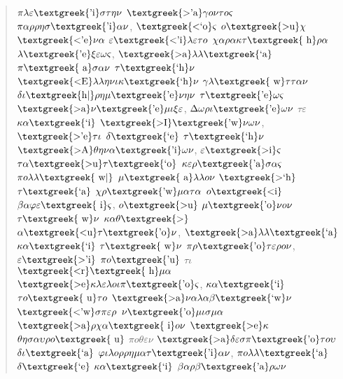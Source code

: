 \begin{quote}
$\pi \lambda \varepsilon \text{\textgreek{'i}}\sigma \tau \eta \nu $ $\text{\textgreek{>'a}}\gamma o\nu \tau o\varsigma $ $\pi \alpha \rho \rho \eta \sigma \text{\textgreek{'i}}\alpha \nu $, $\text{\textgreek{<`o}}\varsigma $ $o\text{\textgreek{>u}}\chi $ $\text{\textgreek{<'e}}\nu \alpha $ $\varepsilon \text{\textgreek{<'i}}\lambda \varepsilon \tau o$ $\chi \alpha \rho \alpha \kappa \tau \text{\textgreek{~h}}\rho \alpha $ $\lambda \text{\textgreek{'e}}\xi \varepsilon \omega \varsigma $, $\text{\textgreek{>a}}\lambda \lambda \text{\textgreek{`a}}$ $\pi \text{\textgreek{~a}}\sigma \alpha \nu $ $\tau \text{\textgreek{`h}}\nu $ $\text{\textgreek{<E}}\lambda \lambda \eta \nu \iota \kappa \text{\textgreek{`h}}\nu $ $\gamma \lambda \text{\textgreek{~w}}\tau \tau \alpha \nu $ $\delta \iota \text{\textgreek{h|}}\rho \eta \mu \text{\textgreek{'e}}\nu \eta \nu $ $\tau \text{\textgreek{'e}}\omega \varsigma $ $\text{\textgreek{>a}}\nu \text{\textgreek{'e}}\mu \iota \xi \varepsilon $, $\Delta \omega \rho \iota \text{\textgreek{'e}}\omega \nu $ $\tau \varepsilon $ $\kappa \alpha \text{\textgreek{`i}}$ $\text{\textgreek{>I}}\text{\textgreek{'w}}\nu \omega \nu $, $\text{\textgreek{>'e}}\tau \iota $ $\delta \text{\textgreek{`e}}$ $\tau \text{\textgreek{`h}}\nu $ $\text{\textgreek{>A}}\theta \eta \nu \alpha \text{\textgreek{'i}}\omega \nu $, $\varepsilon \text{\textgreek{>i}}\varsigma $ $\tau \alpha \text{\textgreek{>u}}\tau \text{\textgreek{`o}}$ $\kappa \varepsilon \rho \text{\textgreek{'a}}\sigma \alpha \varsigma $ $\pi o\lambda \lambda \text{\textgreek{~w|}}$ $\mu \text{\textgreek{~a}}\lambda \lambda o\nu $ $\text{\textgreek{>`h}}$ $\tau \text{\textgreek{`a}}$ $\chi \rho \text{\textgreek{'w}}\mu \alpha \tau \alpha $ $o\text{\textgreek{<i}}$ $\beta \alpha \varphi \varepsilon \text{\textgreek{~i}}\varsigma $, $o\text{\textgreek{>u}}$ $\mu \text{\textgreek{'o}}\nu o\nu $ $\tau \text{\textgreek{~w}}\nu $ $\kappa \alpha \theta \text{\textgreek{>}}$ $\alpha \text{\textgreek{<u}}\tau \text{\textgreek{'o}}\nu $, $\text{\textgreek{>a}}\lambda \lambda \text{\textgreek{`a}}$ $\kappa \alpha \text{\textgreek{`i}}$ $\tau \text{\textgreek{~w}}\nu $ $\pi \rho \text{\textgreek{'o}}\tau \varepsilon \rho o\nu $, $\varepsilon \text{\textgreek{>'i}}$ $\pi o\text{\textgreek{'u}}$ $\tau \iota $ $\text{\textgreek{<r}}\text{\textgreek{~h}}\mu \alpha $ $\text{\textgreek{>e}}\kappa \lambda \varepsilon \lambda o\iota \pi \text{\textgreek{'o}}\varsigma $, $\kappa \alpha \text{\textgreek{`i}}$ $\tau o\text{\textgreek{~u}}\tau o$ $\text{\textgreek{>a}}\nu \alpha \lambda \alpha \beta \text{\textgreek{`w}}\nu $ $\text{\textgreek{<'w}}\sigma \pi \varepsilon \rho $ $\nu \text{\textgreek{'o}}\mu \iota \sigma \mu \alpha $ $\text{\textgreek{>a}}\rho \chi \alpha \text{\textgreek{~i}}o\nu $ $\text{\textgreek{>e}}\kappa $ $\theta \eta \sigma \alpha \upsilon \rho o\text{\textgreek{~u}}$ $\pi o\theta \varepsilon \nu $ $\text{\textgreek{>a}}\delta \varepsilon \sigma \pi \text{\textgreek{'o}}\tau o\upsilon $ $\delta \iota \text{\textgreek{`a}}$ $\varphi \iota \lambda o\rho \rho \eta \mu \alpha \tau \text{\textgreek{'i}}\alpha \nu $, $\pi o\lambda \lambda \text{\textgreek{`a}}$ $\delta \text{\textgreek{`e}}$ $\kappa \alpha \text{\textgreek{`i}}$ $\beta \alpha \rho \beta \text{\textgreek{'a}}\rho \omega \nu $ 
\end{quote}
